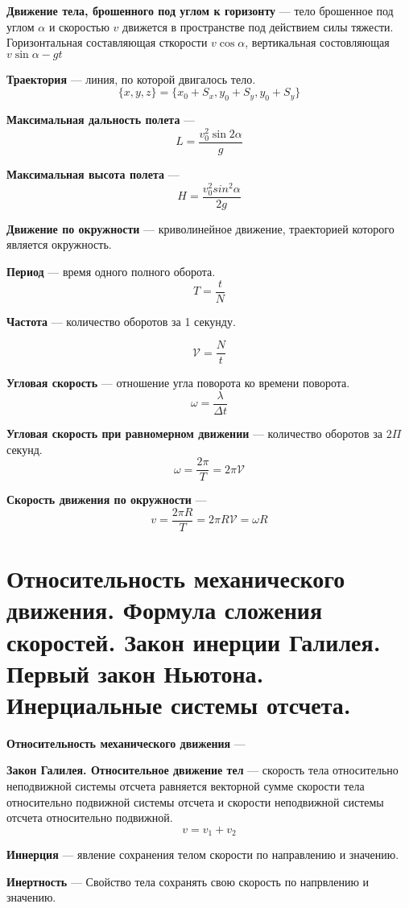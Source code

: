 \documentclass{report}
\begin{document}
{\bf Движение тела, брошенного под углом к горизонту} ---
тело брошенное под углом $\alpha$ и скоростью $v$ движется в пространстве под действием силы тяжести.
Горизонтальная составляющая сткорости $v\cos{\alpha}$, вертикальная состовляющая
$v\sin{\alpha}-gt$

{}

{\bf Траектория} ---
линия, по которой двигалось тело.
$$
\{x,y,z\}=\{x_0+S_x, y_0+S_y, y_0+S_y\}
$$

{\bf Максимальная дальность полета} ---
$$
L=\frac{v^2_0\sin{2\alpha}}{g}
$$

{\bf Максимальная высота полета} ---
$$
H=\frac{v^2_0sin^2{\alpha}}{2g}
$$

{\bf Движение по окружности} ---
криволинейное движение, траекторией которого является окружность.

{\bf Период} ---
время одного полного оборота.
$$
T=\frac{t}{N}
$$

{\bf Частота} ---
количество оборотов за 1 секунду.

$$
\mathcal{V} = \frac{N}{t}
$$

{\bf Угловая скорость} ---
отношение угла поворота ко времени поворота.
$$
\omega =\frac{\lambda}{\Delta t}
$$

{\bf Угловая скорость при равномерном движении} ---
количество оборотов за $2\Pi$ секунд.
$$
\omega =\frac{2\pi}{T}=2\pi \mathcal{V}
$$

{\bf Скорость движения по окружности} ---
$$
v=\frac{2\pi R}{T}=2\pi R \mathcal{V} = \omega R
$$



\part{Относительность механического движения. 
Формула сложения скоростей. 
Закон инерции Галилея. 
Первый закон Ньютона. 
Инерциальные системы отсчета. }

{\bf Относительность механического движения} ---

{\bf Закон Галилея. Относительное движение тел} ---
скорость тела относительно неподвижной системы отсчета равняется векторной 
сумме скорости тела относительно подвижной системы отсчета и скорости 
неподвижной системы отсчета относительно подвижной.
$$
v=v_1+v_2
$$

{\bf Иннерция} ---
явление сохранения телом скорости по направлению и значению.

{\bf Инертность} ---
Свойство тела сохранять свою скорость по напрвлению и значению.
\end{document}
